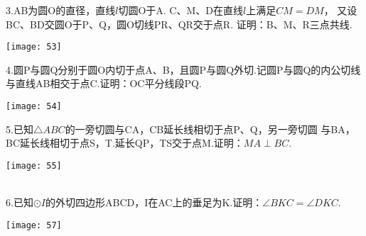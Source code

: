 3.AB为圆O的直径，直线$l$切圆O于A.
C、M、D在直线$l$上满足$CM=DM$，
又设BC、BD交圆O于P、Q，圆O切线PR、QR交于点R.
证明：B、M、R三点共线.
\begin{flushleft}
    \texttt{[image: 53]}
\end{flushleft}
\newpage

4.圆P与圆Q分别于圆O内切于点A、B，且圆P与圆Q外切.记圆P与圆Q的内公切线
与直线AB相交于点C.证明：OC平分线段PQ.
\begin{flushleft}
    \texttt{[image: 54]}
\end{flushleft}

5.已知$\bigtriangleup ABC$的一旁切圆与CA，CB延长线相切于点P、Q，另一旁切圆
与BA，BC延长线相切于点S，T.延长QP，TS交于点M.证明：$MA\perp BC$.
\begin{flushleft}
    \texttt{[image: 55]}
\end{flushleft}
~\\

6.已知$\odot I$的外切四边形ABCD，I在AC上的垂足为K.证明：$\angle BKC=\angle DKC$.
\begin{flushleft}
    \texttt{[image: 57]}
\end{flushleft}

